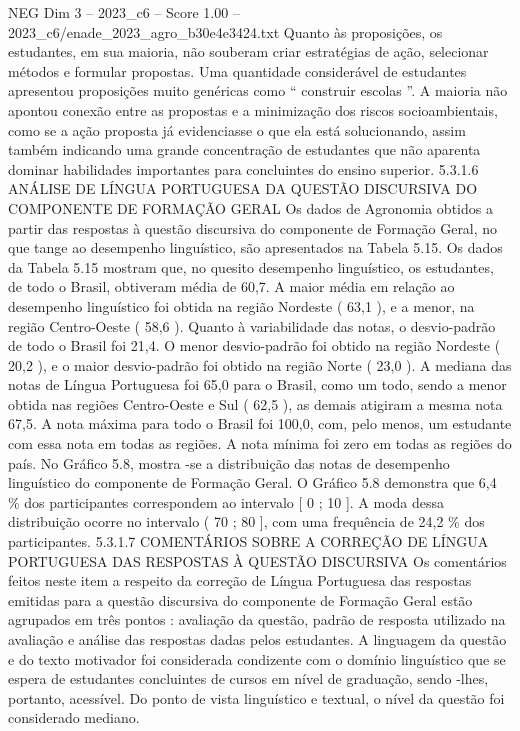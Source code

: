 \begin{textsample}{NEG Dim 3 – 2023\_c6 – Score 1.00 – 2023\_c6/enade\_2023\_agro\_b30e4e3424.txt}
Quanto às proposições, os estudantes, em sua maioria, não souberam criar estratégias de ação, selecionar métodos e formular propostas.
Uma quantidade considerável de estudantes apresentou proposições muito genéricas como “ construir escolas ”.
A maioria não apontou conexão entre as propostas e a minimização dos riscos socioambientais, como se a ação proposta já evidenciasse o que ela está solucionando, assim também indicando uma grande concentração de estudantes que não aparenta dominar habilidades importantes para concluintes do ensino superior. 5.3.1.6 ANÁLISE DE LÍNGUA PORTUGUESA DA QUESTÃO DISCURSIVA DO COMPONENTE DE FORMAÇÃO GERAL Os dados de Agronomia obtidos a partir das respostas à questão discursiva do componente de Formação Geral, no que tange ao desempenho linguístico, são apresentados na Tabela 5.15.
Os dados da Tabela 5.15 mostram que, no quesito desempenho linguístico, os estudantes, de todo o Brasil, obtiveram média de 60,7.
A maior média em relação ao desempenho linguístico foi obtida na região Nordeste ( 63,1 ), e a menor, na região Centro-Oeste ( 58,6 ).
Quanto à variabilidade das notas, o desvio-padrão de todo o Brasil foi 21,4.
O menor desvio-padrão foi obtido na região Nordeste ( 20,2 ), e o maior desvio-padrão foi obtido na região Norte ( 23,0 ).
A mediana das notas de Língua Portuguesa foi 65,0 para o Brasil, como um todo, sendo a menor obtida nas regiões Centro-Oeste e Sul ( 62,5 ), as demais atigiram a mesma nota 67,5.
A nota máxima para todo o Brasil foi 100,0, com, pelo menos, um estudante com essa nota em todas as regiões.
A nota mínima foi zero em todas as regiões do país.
No Gráfico 5.8, mostra -se a distribuição das notas de desempenho linguístico do componente de Formação Geral.
O Gráfico 5.8 demonstra que 6,4 \% dos participantes correspondem ao intervalo [ 0 ; 10 ].
A moda dessa distribuição ocorre no intervalo ( 70 ; 80 ], com uma frequência de 24,2 \% dos participantes. 5.3.1.7 COMENTÁRIOS SOBRE A CORREÇÃO DE LÍNGUA PORTUGUESA DAS RESPOSTAS À QUESTÃO DISCURSIVA Os comentários feitos neste item a respeito da correção de Língua Portuguesa das respostas emitidas para a questão discursiva do componente de Formação Geral estão agrupados em três pontos : avaliação da questão, padrão de resposta utilizado na avaliação e análise das respostas dadas pelos estudantes.
A linguagem da questão e do texto motivador foi considerada condizente com o domínio linguístico que se espera de estudantes concluintes de cursos em nível de graduação, sendo -lhes, portanto, acessível.
Do ponto de vista linguístico e textual, o nível da questão foi considerado mediano.

\end{textsample}
